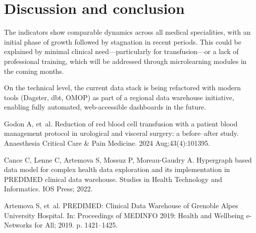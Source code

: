 \documentclass{IOS-Book-Article}
\begin{document}
\section{Discussion and conclusion}

The indicators show comparable dynamics across all medical specialities, with an initial phase of growth followed by stagnation in recent periods. This could be explained by minimal clinical need—particularly for transfusion—or a lack of professional training, which will be addressed through microlearning modules in the coming months.

On the technical level, the current data stack is being refactored with modern tools (Dagster, dbt, OMOP) as part of a regional data warehouse initiative, enabling fully automated, web-accessible dashboards in the future.

\begin{thebibliography}{99}

Godon A, et~al. Reduction of red blood cell transfusion with a patient blood management protocol in urological and visceral surgery: a before–after study. Anaesthesia Critical Care \& Pain Medicine. 2024 Aug;43(4):101395.

Cance C, Lenne C, Artemova S, Mossuz P, Moreau-Gaudry A. Hypergraph based data model for complex health data exploration and its implementation in PREDIMED clinical data warehouse. Studies in Health Technology and Informatics. IOS Press; 2022.

Artemova S, et~al. PREDIMED: Clinical Data Warehouse of Grenoble Alpes University Hospital. In: Proceedings of MEDINFO 2019: Health and Wellbeing e-Networks for All; 2019. p. 1421--1425.



\end{thebibliography}
\end{document}
